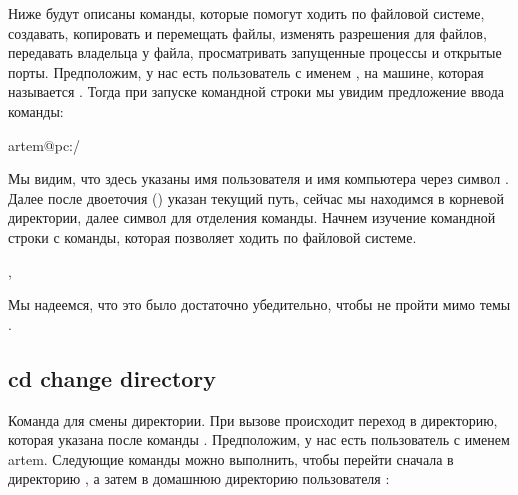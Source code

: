 \documentclass[letterpaper,10pt,russian]{sphinxmanual}
\begin{document}
\sphinxAtStartPar
Ниже будут описаны команды, которые помогут ходить по файловой системе, создавать, копировать и перемещать файлы, изменять разрешения для файлов, передавать владельца у файла, просматривать запущенные процессы и открытые порты.
Предположим, у нас есть пользователь с именем , на машине, которая называется . Тогда при запуске командной строки мы увидим предложение ввода команды:

\begin{sphinxVerbatim}[commandchars=\\\{\}]
artem@pc:/\PYGZdl{}
\end{sphinxVerbatim}

\sphinxAtStartPar
Мы видим, что здесь указаны имя пользователя и имя компьютера через символ . Далее после двоеточия (\sphinxcode{\sphinxupquote{:}}) указан текущий путь, сейчас мы находимся в корневой директории, далее символ \sphinxcode{\sphinxupquote{\$}} для отделения команды. Начнем изучение командной строки с команды, которая позволяет ходить по файловой системе.

\sphinxAtStartPar
{}

\sphinxAtStartPar
{}   ,  

\sphinxAtStartPar
Мы надеемся, что это было достаточно убедительно, чтобы не пройти мимо темы .


\subsection{cd \sphinxhyphen{} change directory}
\label{\detokenize{educational_materials/bash/content:cd-change-directory}}
\sphinxAtStartPar
Команда для смены директории. При вызове происходит переход в директорию, которая указана после команды . Предположим, у нас есть пользователь с именем artem. Следующие команды можно выполнить, чтобы перейти сначала в директорию , а затем в домашнюю директорию пользователя :
\end{document}
